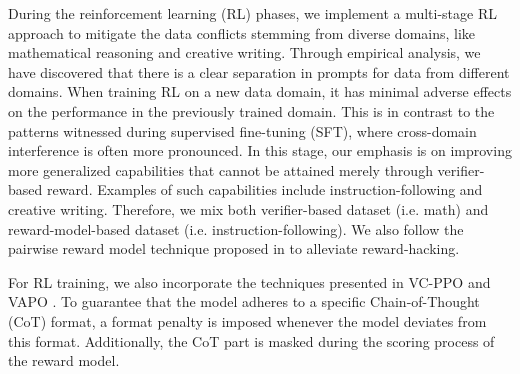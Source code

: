 During the reinforcement learning (RL) phases, we implement a multi-stage RL approach to mitigate the data conflicts stemming from diverse domains, like mathematical reasoning and creative writing. Through empirical analysis, we have discovered that there is a clear separation in prompts for data from different domains. When training RL on a new data domain, it has minimal adverse effects on the performance in the previously trained domain. This is in contrast to the patterns witnessed during supervised fine-tuning (SFT), where cross-domain interference is often more pronounced.
In this stage, our emphasis is on improving more generalized capabilities that cannot be attained merely through verifier-based reward. Examples of such capabilities include instruction-following and creative writing. Therefore, we mix both verifier-based dataset (i.e. math) and reward-model-based dataset (i.e. instruction-following). We also follow the pairwise reward model technique proposed in \citep{qrl} to alleviate reward-hacking.

For RL training, we also incorporate the techniques presented in VC-PPO \citep{yuan2025s} and VAPO \cite{}. To guarantee that the model adheres to a specific Chain-of-Thought (CoT) format, a format penalty is imposed whenever the model deviates from this format. Additionally, the CoT part is masked during the scoring process of the reward model. 




